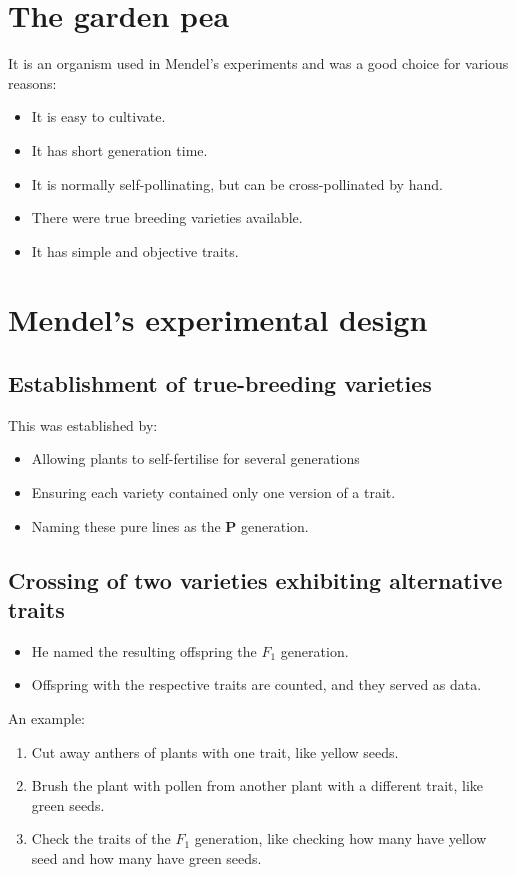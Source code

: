 \documentclass[11pt]{article}
\begin{document}
\section{The garden pea}
\label{sec:orgcee781a}
It is an organism used in Mendel's experiments and was a good choice for various reasons:
\begin{itemize}
\item It is easy to cultivate.
\item It has short generation time.
\item It is normally self-pollinating, but can be cross-pollinated by hand.
\item There were true breeding varieties available.
\item It has simple and objective traits.
\end{itemize}
\section{Mendel's experimental design}
\label{sec:org5f5b2a2}

\subsection{Establishment of true-breeding varieties}
\label{sec:orgdcbb7e4}
This was established by:
\begin{itemize}
\item Allowing plants to self-fertilise for several generations
\item Ensuring each variety contained only one version of a trait.
\item Naming these pure lines as the \textbf{P} generation.
\end{itemize}
\subsection{Crossing of two varieties exhibiting alternative traits}
\label{sec:org1d38493}
\begin{itemize}
\item He named the resulting offspring the \(F_1\) generation.
\item Offspring with the respective traits are counted, and they served as data.
\end{itemize}

An example:
\begin{enumerate}
\item Cut away anthers of plants with one trait, like yellow seeds.
\item Brush the plant with pollen from another plant with a different trait, like green seeds.
\item Check the traits of the \(F_1\) generation, like checking how many have yellow seed and how many have green seeds.
\end{enumerate}
\end{document}
